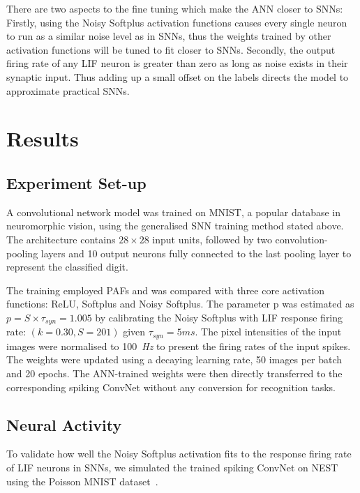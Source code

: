 \documentclass{article}
\begin{document}
	There are two aspects to the fine tuning which make the ANN closer to SNNs:
	Firstly, using the Noisy Softplus activation functions causes every single neuron to run as a similar noise level as in SNNs, thus the weights trained by other activation functions will be tuned to fit closer to SNNs.
	Secondly, the output firing rate of any LIF neuron is greater than zero as long as noise exists in their synaptic input.
	Thus adding up a small offset on the labels directs the model to approximate practical SNNs. 
	
	\section{Results}
	\label{sec:result}
	
	\subsection{Experiment Set-up}
	A convolutional network model was trained on MNIST,
	a popular database in neuromorphic vision, using the generalised SNN training method stated above.
	The architecture contains $28\times28$ input units, followed by two convolution-pooling layers and 10 output neurons fully connected to the last pooling layer to represent the classified digit.
	
	The training employed PAFs and was compared with three core activation functions: ReLU, Softplus and Noisy Softplus.
	The parameter p was estimated as $p = S \times \tau_{syn} = 1.005$ by calibrating the Noisy Softplus with LIF response firing rate: $(k=0.30, S=201)$ given $\tau_{syn}=5 ms$.
	The pixel intensities of the input images were normalised to 100~\textit{Hz} to present the firing rates of the input spikes.
	The weights were updated using a decaying learning rate, 50 images per batch and 20 epochs.
	The ANN-trained weights were then directly transferred to the corresponding spiking ConvNet without any conversion for recognition tasks.
	
	
	\subsection{Neural Activity}
	To validate how well the Noisy Softplus activation fits to the response firing rate of LIF neurons in SNNs, we simulated the trained spiking ConvNet on NEST~\cite{gewaltig2007nest} using the Poisson MNIST dataset~\cite{liu2016bench}.
	
\end{document}
